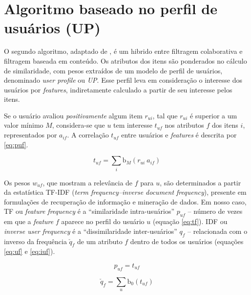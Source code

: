 
\section{Algoritmo baseado no perfil de usuários (UP)} %
\label{sec:algoritmo_baseado_no_perfil_de_usu_rios_}


O segundo algoritmo, adaptado de \cite{debnath2008feature}, é um hibrido entre filtragem colaborativa e filtragem baseada em conteúdo. Os atributos dos itens são ponderados no cálculo de similaridade, com pesos extraídos de um modelo de perfil de usuários, denominado \textit{user profile} ou \textit{UP}. Esse perfil leva em consideração o interesse dos usuários por \textit{features}, indiretamente calculado a partir de seu interesse pelos itens. 

Se o usuário avaliou \textit{positivamente} algum item $r_{ui}$, tal que $r_{ui}$ é superior a um valor mínimo $M$, considera-se que $u$ tem interesse $t_{uf}$ nos atributos $f$ dos itens $i$, representados por $a_{if}$. A correlação $t_{uf}$ entre usuários e \textit{features} é descrita por \ref{eq:puf}.

\begin{equation}
\label{eq:puf} 
    t_{uf} = \sum_{i}{\mathrm{b}_M\left(r_{ui}~a_{if}\right)} 
\end{equation} 

Os pesos $w_{uf}$, que mostram a relevância de $f$ para $u$, são determinados a partir da estatística TF-IDF (\textit{term frequency--inverse document frequency}), presente em formulações de recuperação de informação e mineração de dados. Em nosso caso, TF ou \textit{feature frequency} é a ``similaridade intra-usuários'' $p_{uf}$ -- número de vezes em que a \textit{feature} $f$ aparece no perfil do usuário $u$ (equação \ref{eq:tf}). IDF ou \textit{inverse user frequency} é a ``dissimilaridade inter-usuários'' $q_{f}$ -- relacionada com o inverso da frequência $\check{q}_{f}$ de um atributo $f$ dentro de todos os usuários (equações \ref{eq:uf} e \ref{eq:iuf}).

\begin{equation}
\label{eq:tf} 
    p_{uf} = t_{uf}
\end{equation} 


\begin{equation}
\label{eq:uf} 
    \check{q}_{f} = \sum_{u}{\mathrm{b}_0\left(t_{uf}\right)}
\end{equation} 

